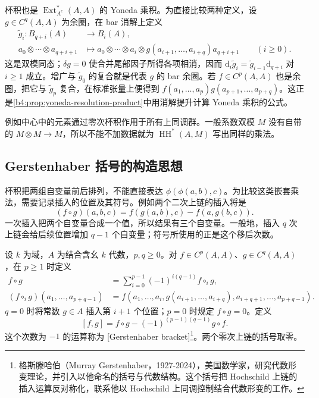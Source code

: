 杯积也是 \(\operatorname{Ext}_{A^e}^*(A,A)\) 的 Yoneda 乘积。为直接比较两种定义，设 \(g\in C^q(A,A)\) 为余圈，在 bar 消解上定义
\[
	\begin{aligned}
		\widetilde g_i:B_{q+i}(A)&\longrightarrow B_i(A),\\
		a_0\otimes\cdots\otimes a_{q+i+1} &\longmapsto a_0\otimes\cdots\otimes a_i\otimes g(a_{i+1},\ldots,a_{i+q})a_{q+i+1}\qquad(i\ge0).
	\end{aligned}
\]
这是双模同态；\(\delta g=0\) 使合并尾部因子所得各项相消，因而 \(\mathrm{d}_i\widetilde g_i=\widetilde g_{i-1}\mathrm{d}_{q+i}\) 对 \(i\ge1\) 成立。增广与 \(\widetilde g_0\) 的复合就是代表 \(g\) 的 bar 余圈。若 \(f\in C^p(A,A)\) 也是余圈，把它与 \(\widetilde g_p\) 复合，在标准张量上便得到 \(f(a_1,\ldots,a_p)g(a_{p+1},\ldots,a_{p+q})\)。这正是\cref{b4:prop:yoneda-resolution-product}中用消解提升计算 Yoneda 乘积的公式。

\ProseParagraphBreak
例如中心中的元素通过零次杯积作用于所有上同调群。一般系数双模 \(M\) 没有自带的 \(M\otimes M\to M\)，所以不能不加数据就为 \(\operatorname{HH}^*(A,M)\) 写出同样的乘法。

\subsection{Gerstenhaber 括号的构造思想}
\label{b4:subsec:1203:02}

杯积把两组自变量前后排列，不能直接表达 \(\phi(\phi(a,b),c)\)。为比较这类嵌套乘法，需要记录插入的位置及其符号。例如两个二次上链的插入将是
\[
	(f\circ g)(a,b,c)=f(g(a,b),c)-f(a,g(b,c)).
\]
一次插入把两个自变量合成一个值，所以结果有三个自变量。一般地，插入 \(q\) 次上链会给后续位置增加 \(q-1\) 个自变量；符号所使用的正是这个移后次数。

\begin{definition}\label{b4:def:gerstenhaber-bracket}
	设 \(k\) 为域，\(A\) 为结合含幺 \(k\) 代数，\(p,q\ge0\)。对 \(f\in C^p(A,A)\)、\(g\in C^q(A,A)\)，在 \(p\ge1\) 时定义
	\[
		\begin{aligned}
			f\circ g&=\sum_{i=0}^{p-1}(-1)^{i(q-1)}f\circ_i g,\\
			(f\circ_i g)(a_1,\ldots,a_{p+q-1}) &=f(a_1,\ldots,a_i,g(a_{i+1},\ldots,a_{i+q}), a_{i+q+1},\ldots,a_{p+q-1}).
		\end{aligned}
	\]
	\(q=0\) 时将常数 \(g\in A\) 插入第 \(i+1\) 个位置；\(p=0\) 时规定 \(f\circ g=0\)。定义
	\[
		[f,g]=f\circ g-(-1)^{(p-1)(q-1)}g\circ f.
	\]
	这个次数为 \(-1\) 的运算称为 [Gerstenhaber bracket]\footnote{格斯滕哈伯（Murray Gerstenhaber，1927-2024），美国数学家，研究代数形变理论，并引入以他命名的括号与代数结构。这个括号把 Hochschild 上链的插入运算反对称化，联系他以 Hochschild 上同调控制结合代数形变的工作。}。两个零次上链的括号取零。
\end{definition}

